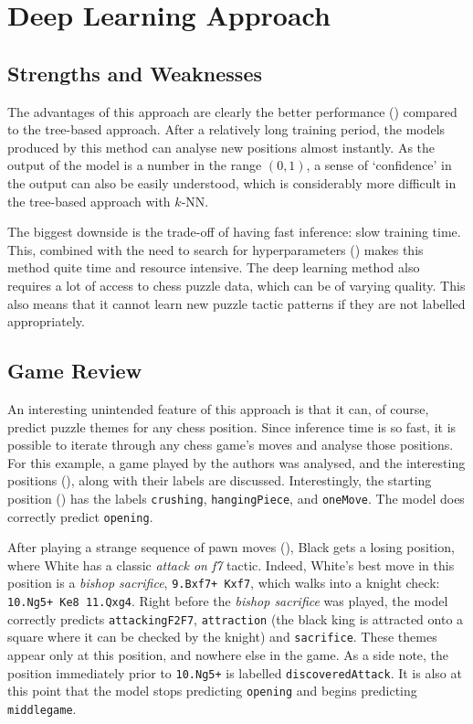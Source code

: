 \section{Deep Learning Approach}\label{evalS3}

\subsection{Strengths and Weaknesses}\label{evalS31}

The advantages of this approach are clearly the better performance
() compared to the tree-based approach. After a relatively
long training period, the models produced by this method can analyse new
positions almost instantly. As the output of the model is a number in the range
$(0, 1)$, a sense of `confidence' in the output can also be easily understood,
which is considerably more difficult in the tree-based approach with $k$-NN.

The biggest downside is the trade-off of having fast inference: slow training
time. This, combined with the need to search for hyperparameters ()
makes this method quite time and resource intensive. The deep learning method
also requires a lot of access to chess puzzle data, which can be of varying
quality. This also means that it cannot learn new puzzle tactic patterns if
they are not labelled appropriately.

\subsection{Game Review}\label{evalS32}

An interesting unintended feature of this approach is that it can, of course,
predict puzzle themes for any chess position. Since inference time is so fast,
it is possible to iterate through any chess game's moves and analyse those
positions. For this example, a game played by the authors was analysed, and the
interesting positions (), along with
their labels are discussed. Interestingly, the starting position
() has the labels \texttt{crushing}, \texttt{hangingPiece}, and
\texttt{oneMove}. The model does correctly predict \texttt{opening}. 

After playing a strange sequence of pawn moves (), Black gets a
losing position, where White has a classic \emph{attack on f7} tactic. Indeed,
White's best move in this position is a \emph{bishop sacrifice},
\texttt{9.Bxf7+ Kxf7}, which walks into a knight check: \texttt{10.Ng5+ Ke8
11.Qxg4}. Right before the \emph{bishop sacrifice} was played, the model
correctly predicts \texttt{attackingF2F7}, \texttt{attraction} (the black king
is attracted onto a square where it can be checked by the knight) and
\texttt{sacrifice}. These themes appear only at this position, and nowhere else
in the game. As a side note, the position immediately prior to \texttt{10.Ng5+}
is labelled \texttt{discoveredAttack}. It is also at this point that the model
stops predicting \texttt{opening} and begins predicting \texttt{middlegame}.

